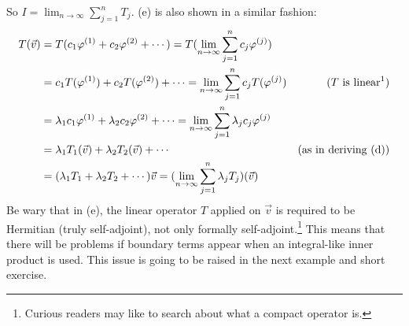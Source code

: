 So $I = \lim_{n \to \infty} \sum_{j=1}^{n} T_j$. (e) is also shown in a similar fashion:
\begin{align*}
T(\vec{v}) &= T(c_1\varphi^{(1)} + c_2\varphi^{(2)} + \cdots) = T(\lim_{n \to \infty} \sum_{j=1}^{n} c_j\varphi^{(j)}) \\
&= c_1T(\varphi^{(1)}) + c_2T(\varphi^{(2)}) + \cdots = \lim_{n \to \infty} \sum_{j=1}^{n} c_jT(\varphi^{(j)}) & \text{($T$ is linear\footnotemark)}\\
&= \lambda_1 c_1\varphi^{(1)} + \lambda_2 c_2\varphi^{(2)} + \cdots =  \lim_{n \to \infty} \sum_{j=1}^{n} \lambda_jc_j\varphi^{(j)} \\
&= \lambda_1 T_1(\vec{v}) + \lambda_2 T_2(\vec{v}) + \cdots & \text{(as in deriving (d))} \\
&= (\lambda_1T_1 + \lambda_2T_2 + \cdots)\vec{v} = (\lim_{n \to \infty} \sum_{j=1}^{n} \lambda_jT_j)(\vec{v}) 
\end{align*}
Be wary that in (e), the linear operator $T$ applied on $\vec{v}$ is required to be Hermitian (truly self-adjoint), not only formally self-adjoint.\footnote{Curious readers may like to search about what a compact operator is.} This means that there will be problems if boundary terms appear when an integral-like inner product is used. This issue is going to be raised in the next example and short exercise.\par

